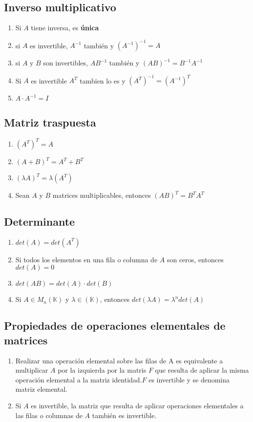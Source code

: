 \documentclass[]{article}
\begin{document}
\subsection{Inverso multiplicativo}
\begin{enumerate}
	\item Si $A$ tiene inversa, es \textbf{única}
	\item si $A$ es invertible, $A^{-1}$ también y $(A^{-1})^{-1}=A$
	\item si $A$ y $B$ son invertibles, $AB^{-1}$ también y $(AB)^{-1}=B^{-1}A^{-1}$
	\item Si $A$ es invertible $A^{T}$ tambien lo es y $(A^{T})^{-1}=(A^{-1})^{T}$
	\item $A \cdot A^{-1}=I$
\end{enumerate}



\subsection{Matriz traspuesta}
\begin{enumerate}
	\item $(A^{T})^{T}=A$
	\item $(A+B)^{T}=A^{T}+B^{T}$
	\item $(\lambda A)^{T}= \lambda (A^{T})$
	\item Sean $A$ y $B$ matrices multiplicables, entonces $(AB)^{T}=B^{T}A^{T}$
\end{enumerate}



\subsection{Determinante}
\begin{enumerate}
	\item $det(A)=det(A^{T})$
	\item Si todos los elementos en una fila o columna de $A$ son ceros, entonces $det(A)=0$
	\item $det(AB)=det(A) \cdot det(B)$
	\item Si $A \in M_{n}(\mathbb{K})$ y $\lambda \in (\mathbb{K})$, entonces $det(\lambda A)=\lambda^{n}det(A)$
\end{enumerate}



\subsection{Propiedades de operaciones elementales de matrices}
\begin{enumerate}
	\item Realizar una operación elemental sobre las filas de A es equivalente a multiplicar $A$ por la izquierda por la matris $F$ que resulta de aplicar la misma operación elemental a la matriz identidad.$F$ es invertible y se denomina matriz elemental.
	\item Si $A$ es invertible, la matriz que resulta de aplicar operaciones elementales a las filas o columnas de $A$ también es invertible.
\end{enumerate}
\end{document}
